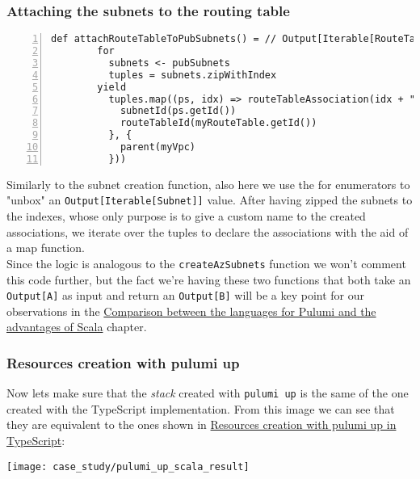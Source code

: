 \subsubsection{Attaching the subnets to the routing table}
\begin{minipage}{\linewidth}
\begin{lstlisting}[numbers=left, numberstyle=\tiny, numbersep=-5pt, stepnumber=1]
  def attachRouteTableToPubSubnets() = // Output[Iterable[RouteTableAssociation]] 
        for
          subnets <- pubSubnets
          tuples = subnets.zipWithIndex
        yield
          tuples.map((ps, idx) => routeTableAssociation(idx + "-assoc-scala") ({
            subnetId(ps.getId())
            routeTableId(myRouteTable.getId())
          }, {
            parent(myVpc)
          }))
\end{lstlisting}
\end{minipage}
Similarly to the subnet creation function, also here we use the for enumerators to "unbox" an \texttt{Output[Iterable[Subnet]]} value.
After having zipped the subnets to the indexes, whose only purpose is to give a custom name to the created associations, we iterate over the tuples to declare the associations with the aid of a map function.\\
Since the logic is analogous to the \texttt{createAzSubnets} function we won't comment this code further, but the fact we're having these two functions that both take an \texttt{Output[A]} as input and return an \texttt{Output[B]} will be a key point for our observations in the \hyperref[cap:comparisons]{Comparison between the languages for Pulumi and the advantages of Scala} chapter.

\subsubsection{Resources creation with pulumi up}
\label{sssec:res-cre-ts}
Now lets make sure that the \textit{stack} created with \texttt{pulumi up} is the same of the one created with the TypeScript implementation.
From this image we can see that they are equivalent to the ones shown in \hyperref[sssec:res-cre-ts]{Resources creation with pulumi up in TypeScript}:
\begin{center}
  \texttt{[image: case\_study/pulumi\_up\_scala\_result]} 
\end{center}\mbox{}\\

